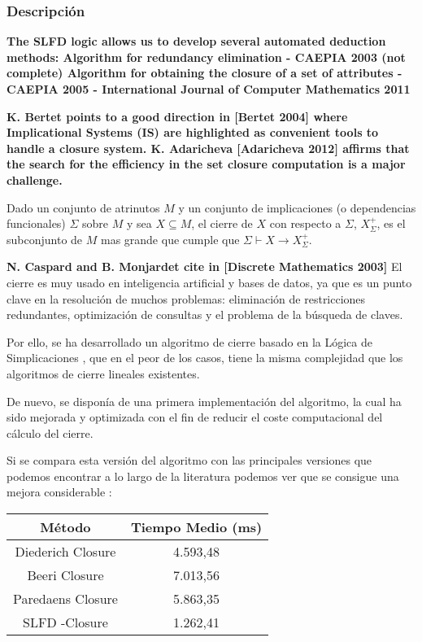 \subsubsection{Descripci\'on} 

\textbf{The SLFD logic allows us to develop several automated deduction methods:
Algorithm for redundancy elimination - CAEPIA 2003 (not complete)
Algorithm for obtaining the closure of a set of attributes - CAEPIA 2005 - International Journal of Computer Mathematics 2011}

\textbf{K. Bertet points to a good direction in [Bertet 2004] where Implicational Systems (IS) are highlighted as convenient tools to handle a closure system.
K. Adaricheva [Adaricheva 2012] affirms that the search for the efficiency in the set closure computation is a major challenge.}

Dado un conjunto de atrinutos \( M \) y un conjunto de implicaciones (o dependencias funcionales) \( \Sigma \) sobre \( M \) y sea \( X \subseteq M \), el cierre de \( X \) con respecto a \( \Sigma \), \( X^+_{\Sigma} \), es el subconjunto de \( M \) mas grande que cumple que \( \Sigma \vdash X \to X^+_{\Sigma} \).

\textbf{N. Caspard and B. Monjardet cite in [Discrete Mathematics 2003]}
El cierre es muy usado en inteligencia artificial y bases de datos, ya que es un punto clave en la resoluci\'on de muchos problemas: eliminaci\'on de restricciones redundantes, optimizaci\'on de consultas y el problema de la b\'usqueda de claves.

Por ello, se ha desarrollado un algoritmo de cierre basado en la L\'ogica de Simplicaciones \cite{Mora2012a}, que en el peor de los casos, tiene la misma complejidad que los algoritmos de cierre lineales existentes.

De nuevo, se dispon\'ia de una primera implementaci\'on del algoritmo, la cual ha sido mejorada y optimizada con el fin de reducir el coste computacional del c\'alculo del cierre.

Si se compara esta versi\'on del algoritmo con las principales versiones que podemos encontrar a lo largo de la literatura podemos ver que se consigue una mejora considerable \cite{Mora2012a}:

\begin{center}
    \begin{tabular}{c c}
        \hline
        M\'etodo & Tiempo Medio (ms) \\
        \hline
        Diederich Closure & 4.593,48 \\   
        Beeri Closure & 7.013,56 \\   
        Paredaens Closure & 5.863,35 \\  
        SLFD -Closure & 1.262,41 \\  
    \end{tabular}
\end{center}
\newpage

